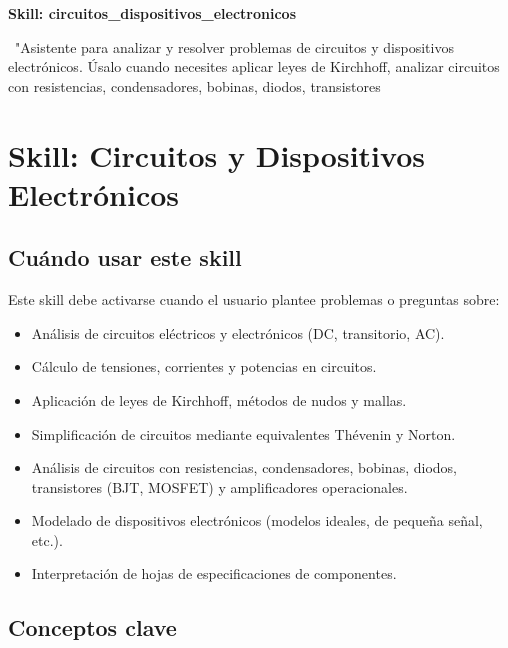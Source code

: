 \documentclass[11pt,a4paper]{article}
\newcommand{\iconoBanda}{microchip}
\newcommand{\bandaTitulo}[3][fondoOscuro]{%
  \begin{tcolorbox}[
    enhanced,
    colback=#1, colframe=#1,
    boxrule=0pt, arc=8pt, outer arc=8pt,
    width=\linewidth,
    top=18pt, bottom=6pt, left=14pt, right=14pt,
    borderline south={3.5pt}{0pt}{cyanNeon},
  ]
    \begin{minipage}[c]{0.07\linewidth}
      \centering
      \textcolor{cyanNeon}{\fontsize{30}{30}\selectfont\faIcon{\iconoBanda}}
    \end{minipage}%
    \hspace{8pt}%
    \begin{minipage}[c]{0.88\linewidth}
      {\fontsize{20}{24}\selectfont\bfseries\color{white}#2}\par\vspace{5pt}%
      \textcolor{cyanNeon!80!white}{\small\faIcon{angle-right}~#3}%
    \end{minipage}
    \vspace{4pt}
  \end{tcolorbox}%
  \vspace{8pt}%
}
\renewcommand{\iconoBanda}{book}
\begin{document}
\bandaTitulo[fondoOscuro]{Skill: circuitos\_dispositivos\_electronicos}{"Asistente para analizar y resolver problemas de circuitos y dispositivos electrónicos. Úsalo cuando necesites aplicar leyes de Kirchhoff, analizar circuitos con resistencias, condensadores, bobinas, diodos, transistores}

\section*{Skill: Circuitos y Dispositivos Electrónicos}


\subsection*{Cuándo usar este skill}


Este skill debe activarse cuando el usuario plantee problemas o preguntas sobre:


\begin{itemize}[leftmargin=*,topsep=2pt,itemsep=1pt]
  \item Análisis de circuitos eléctricos y electrónicos (DC, transitorio, AC).
  \item Cálculo de tensiones, corrientes y potencias en circuitos.
  \item Aplicación de leyes de Kirchhoff, métodos de nudos y mallas.
  \item Simplificación de circuitos mediante equivalentes Thévenin y Norton.
  \item Análisis de circuitos con resistencias, condensadores, bobinas, diodos, transistores (BJT, MOSFET) y amplificadores operacionales.
  \item Modelado de dispositivos electrónicos (modelos ideales, de pequeña señal, etc.).
  \item Interpretación de hojas de especificaciones de componentes.
\end{itemize}


\subsection*{Conceptos clave}
\end{document}
